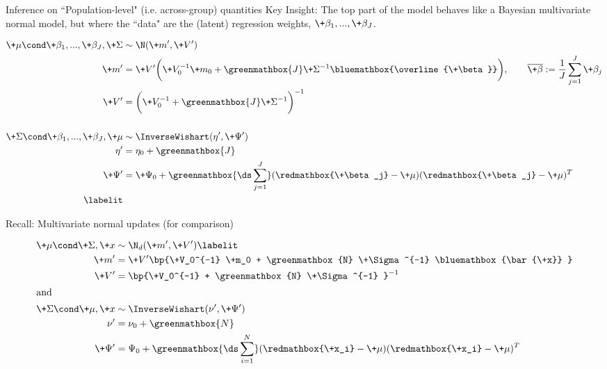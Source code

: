 \documentclass[10pt]{beamer}
\begin{document}
\begin{frame}{Inference on ``Population-level" (i.e. across-group) quantities}
\alert{Key Insight}: The top part of the model behaves like a Bayesian multivariate normal model,    but where the ``data" are the (latent) regression weights,  $\+\beta_1, ...,\+\beta_J$. 

\begin{align*}
\+\mu \cond  \+\beta_1, ...,\+\beta_J,  \+\Sigma &\sim \N(\+m^\prime,  \+V^\prime) \\
\+m^\prime &= \+V^\prime \bigg( \+V_0^{-1} \+m_0 + \greenmathbox{J} \+\Sigma^{-1} \bluemathbox{\overline{\+\beta}} \bigg),  \quad \quad \overline{\+\beta} := \frac{1}{J} \sum_{j=1}^J \+\beta_j \\ 
\+V^\prime &=  \bigg( \+V_0^{-1} + \greenmathbox{J} \+\Sigma^{-1} \bigg)^{-1} \\
& \\ 
\+\Sigma \cond \+\beta_1, ...,\+\beta_J,  \+\mu &\sim \InverseWishart (\eta^\prime, \+\Psi^\prime) \\
\eta^\prime &= \eta_0 + \greenmathbox{J} \\
\+\Psi^\prime &= \+\Psi_0 + \greenmathbox{\ds\sum_{j=1}^J} (\redmathbox{\+\beta_j} - \+\mu) (\redmathbox{\+\beta_j} -\+\mu)^T \\
\labelit \label{eqn:hierarchical_linear_regression_ccs}
\end{align*}


\end{frame}

\begin{frame}{Recall: Multivariate normal updates (for comparison)}

\begin{align*}
\+\mu  \cond \+\Sigma, \+x &\sim \N_{d}(\+m',\+V' )  \labelit\label{eqn:normal_model_complete_conditional_on_mu} \\
\+m'  &=  \+V'  \bp{\+V_0^{-1} \+m_0 + \greenmathbox{N} \+\Sigma^{-1}  \bluemathbox{\bar{\+x}} } \\
\+V' &= \bp{\+V_0^{-1} +  \greenmathbox{N} \+\Sigma^{-1} }^{-1} \\
\intertext{and}
\+\Sigma \cond \+\mu,  \+x  &\sim \InverseWishart(\nu',  \+\Psi')  \\
\nu' &=  \nu_0 + \greenmathbox{N} \\
\+\Psi' &= \Psi_0 + \greenmathbox{\ds\sum_{i=1}^N}  (\redmathbox{\+x_i} - \+\mu) (\redmathbox{\+x_i} - \+\mu)^T  
\end{align*}
	
\end{frame}
\end{document}
